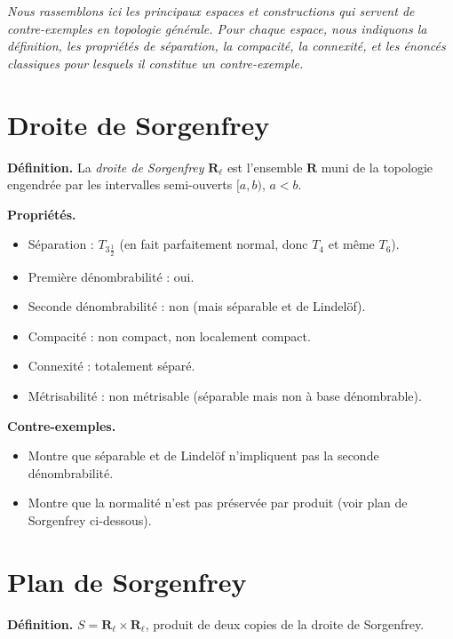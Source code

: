 \documentclass[12pt,a4paper,openany]{book}
\theoremstyle{definition}
\theoremstyle{cours}
\theoremstyle{coursnormal}
\begin{document}
\noindent
\textit{Nous rassemblons ici les principaux espaces et constructions
qui servent de contre-exemples en topologie générale. Pour chaque
espace, nous indiquons la définition, les propriétés de séparation,
la compacité, la connexité, et les énoncés classiques pour lesquels
il constitue un contre-exemple.}

\bigskip

\section{Droite de Sorgenfrey}
\label{app:sorgenfrey}

\textbf{Définition.} La \emph{droite de Sorgenfrey} $\mathbf{R}_\ell$
est l'ensemble $\mathbf{R}$ muni de la topologie engendrée par les
intervalles semi-ouverts $[a,b)$, $a<b$.

\textbf{Propriétés.}
\begin{itemize}
  \item Séparation : $T_{3\frac{1}{2}}$ (en fait parfaitement normal,
    donc $T_4$ et même $T_6$).
  \item Première dénombrabilité : oui.
  \item Seconde dénombrabilité : non (mais séparable et de Lindelöf).
  \item Compacité : non compact, non localement compact.
  \item Connexité : totalement séparé.
  \item Métrisabilité : non métrisable (séparable mais non à base
    dénombrable).
\end{itemize}

\textbf{Contre-exemples.}
\begin{itemize}
  \item Montre que séparable et de Lindelöf n'impliquent pas
    la seconde dénombrabilité.
  \item Montre que la normalité n'est pas préservée par produit
    (voir plan de Sorgenfrey ci-dessous).
\end{itemize}

\section{Plan de Sorgenfrey}
\label{app:plan-sorgenfrey}

\textbf{Définition.} $S=\mathbf{R}_\ell\times\mathbf{R}_\ell$,
produit de deux copies de la droite de Sorgenfrey.
\end{document}
